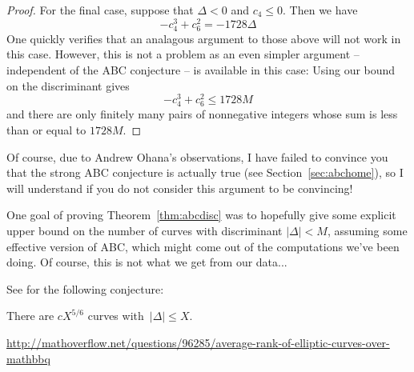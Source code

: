 \documentclass{book}
\begin{document}
\begin{proof}
For the final case, suppose that $\Delta < 0$ and $c_4 \leq 0$.
Then we have
$$
-c_4^3 + c_6^2 = - 1728 \Delta
$$
One quickly verifies that an analagous argument to those above will
not work in this case.  However, this is not a problem as an even simpler
argument -- independent of the ABC conjecture -- is available in this case:
Using our bound on the discriminant gives
$$
-c_4^3 + c_6^2 \leq 1728M
$$
and there are only finitely many pairs of nonnegative integers whose sum is
less than or equal to $1728M$.
\end{proof}

Of course, due to Andrew Ohana's observations,
I have failed to convince you
that the strong ABC conjecture is actually true (see Section~\ref{sec:abchome}),
so I will understand if you do not consider this argument
to be convincing!

One goal of proving Theorem~\ref{thm:abcdisc} was to hopefully
give some explicit upper bound on the number of curves with
discriminant $|\Delta| < M$, assuming some effective version
of ABC, which might come out of the computations we've been
doing.   Of course, this is not what we get from our data...

See \cite[\S3.4]{bmsw:bulletins} for the following conjecture:
\begin{conjecture}
There are $cX^{5/6}$ curves with~$|\Delta|\le X$.
\end{conjecture}
\url{http://mathoverflow.net/questions/96285/average-rank-of-elliptic-curves-over-mathbbq}
\end{document}
